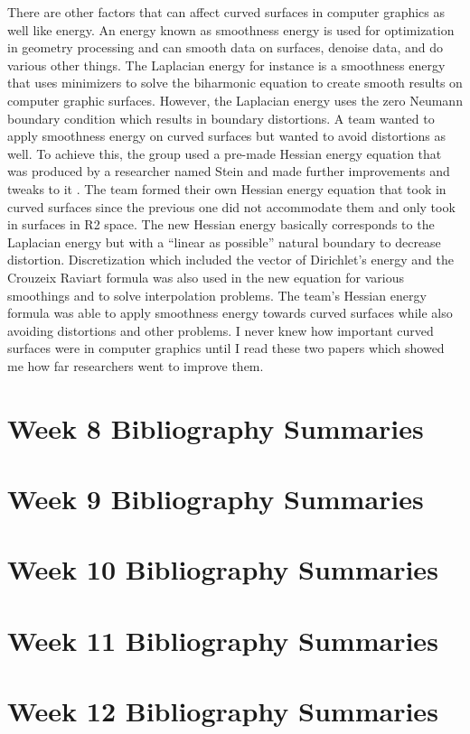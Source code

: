 \documentclass{article}
\begin{document}
There are other factors that can affect curved surfaces in computer graphics as well like energy. An energy known as smoothness energy is used for optimization in geometry processing and can smooth data on surfaces, denoise data, and do various other things. The Laplacian energy for instance is a smoothness energy that uses minimizers to solve the biharmonic equation to create smooth results on computer graphic surfaces. However, the Laplacian energy uses the zero Neumann boundary condition which results in boundary distortions. A team wanted to apply smoothness energy on curved surfaces but wanted to avoid distortions as well. To achieve this, the group used a pre-made Hessian energy equation that was produced by a researcher named Stein and made further improvements and tweaks to it \cite{10.1145/3377406}. The team formed their own Hessian energy equation that took in curved surfaces since the previous one did not accommodate them and only took in surfaces in R2 space. The new Hessian energy basically corresponds to the Laplacian energy but with a “linear as possible” natural boundary to decrease distortion. Discretization which included the vector of Dirichlet’s energy and the Crouzeix Raviart formula was also used in the new equation for various smoothings and to solve interpolation problems. The team’s Hessian energy formula was able to apply smoothness energy towards curved surfaces while also avoiding distortions and other problems. I never knew how important curved surfaces were in computer graphics until I read these two papers which showed me how far researchers went to improve them. 
	
\section{Week 8 Bibliography Summaries}

\section{Week 9 Bibliography Summaries}

\section{Week 10 Bibliography Summaries}

\section{Week 11 Bibliography Summaries}

\section{Week 12 Bibliography Summaries}




\end{document}
